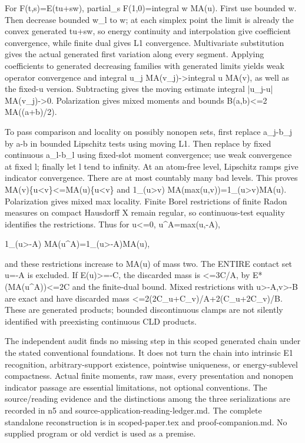 \documentclass[11pt]{article}
\begin{document}
For F(t,s)=E(tu+sw), partial\_s F(1,0)=integral w MA(u). First use bounded w. Then decrease bounded w\_l to w; at each simplex point the limit is already the convex generated tu+sw, so energy continuity and interpolation give coefficient convergence, while finite dual gives L1 convergence. Multivariate substitution gives the actual generated first variation along every segment. Applying coefficients to generated decreasing families with generated limits yields weak operator convergence and integral u\_j MA(v\_j)->integral u MA(v), as well as the fixed-u version. Subtracting gives the moving estimate integral |u\_j-u| MA(v\_j)->0. Polarization gives mixed moments and bounds B(a,b)<=2 MA((a+b)/2).

To pass comparison and locality on possibly nonopen sets, first replace a\_j-b\_j by a-b in bounded Lipschitz tests using moving L1. Then replace by fixed continuous a\_l-b\_l using fixed-slot moment convergence; use weak convergence at fixed l; finally let l tend to infinity. At an atom-free level, Lipschitz ramps give indicator convergence. There are at most countably many bad levels. This proves MA(v)\{u<v\}<=MA(u)\{u<v\} and 1\_(u>v) MA(max(u,v))=1\_(u>v)MA(u). Polarization gives mixed max locality. Finite Borel restrictions of finite Radon measures on compact Hausdorff X remain regular, so continuous-test equality identifies the restrictions. Thus for u<=0, u\textasciicircum{}A=max(u,-A),

1\_(u>-A) MA(u\textasciicircum{}A)=1\_(u>-A)MA(u),

and these restrictions increase to MA(u) of mass two. The ENTIRE contact set u=-A is excluded. If E(u)>=-C, the discarded mass is <=3C/A, by E*(MA(u\textasciicircum{}A))<=2C and the finite-dual bound. Mixed restrictions with u>-A,v>-B are exact and have discarded mass <=2(2C\_u+C\_v)/A+2(C\_u+2C\_v)/B. These are generated products; bounded discontinuous clamps are not silently identified with preexisting continuous CLD products.

The independent audit finds no missing step in this scoped generated chain under the stated conventional foundations. It does not turn the chain into intrinsic E1 recognition, arbitrary-support existence, pointwise uniqueness, or energy-sublevel compactness. Actual finite moments, raw mass, every presentation and nonopen indicator passage are essential limitations, not optional conventions. The source/reading evidence and the distinctions among the three serializations are recorded in n5 and source-application-reading-ledger.md. The complete standalone reconstruction is in scoped-paper.tex and proof-companion.md. No supplied program or old verdict is used as a premise.
\end{document}
